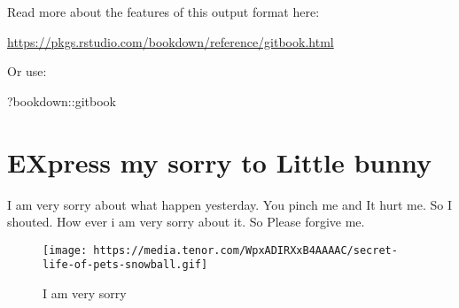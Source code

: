 \documentclass[
]{book}
\newenvironment{Shaded}{\begin{snugshade}}{\end{snugshade}}
\newcommand{\NormalTok}[1]{#1}
\newcommand{\SpecialCharTok}[1]{\textcolor[rgb]{0.00,0.00,0.00}{#1}}
\begin{document}
Read more about the features of this output format here:

\url{https://pkgs.rstudio.com/bookdown/reference/gitbook.html}

Or use:

\begin{Shaded}
\begin{Highlighting}[]
\NormalTok{?bookdown}\SpecialCharTok{::}\NormalTok{gitbook}
\end{Highlighting}
\end{Shaded}

\hypertarget{express-my-sorry-to-little-bunny}{%
\chapter{EXpress my sorry to Little bunny}\label{express-my-sorry-to-little-bunny}}

I am very sorry about what happen yesterday. You pinch me and It hurt me. So I shouted.
How ever i am very sorry about it. So Please forgive me.

\begin{figure}
\centering
\texttt{[image: https://media.tenor.com/WpxADIRXxB4AAAAC/secret-life-of-pets-snowball.gif]}
\caption{I am very sorry}
\end{figure}

  
\end{document}

